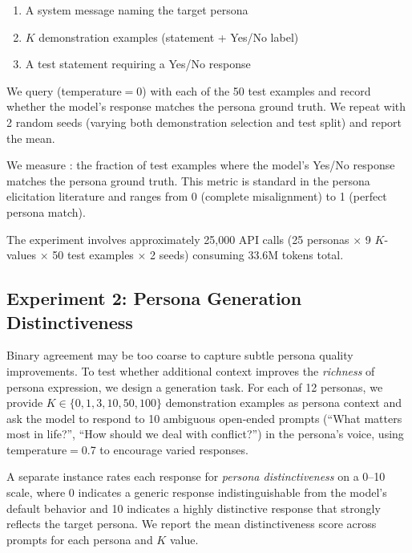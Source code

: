 \begin{enumerate}[leftmargin=*,itemsep=0pt,topsep=2pt]
    \item A system message naming the target persona
    \item $K$ demonstration examples (statement + Yes/No label)
    \item A test statement requiring a Yes/No response
\end{enumerate}

We query \gptmini (temperature$=$0) with each of the 50 test examples and record whether the model's response matches the persona ground truth. We repeat with 2 random seeds (varying both demonstration selection and test split) and report the mean.

 We measure \acmetric: the fraction of test examples where the model's Yes/No response matches the persona ground truth. This metric is standard in the persona elicitation literature \citep{choi2024picle} and ranges from 0 (complete misalignment) to 1 (perfect persona match).

 The experiment involves approximately 25,000 API calls (25 personas $\times$ 9 $K$-values $\times$ 50 test examples $\times$ 2 seeds) consuming 33.6M tokens total.

\subsection{Experiment 2: Persona Generation Distinctiveness}
\label{sec:exp2}

Binary agreement may be too coarse to capture subtle persona quality improvements. To test whether additional context improves the \emph{richness} of persona expression, we design a generation task. For each of 12 personas, we provide $K \in \{0, 1, 3, 10, 50, 100\}$ demonstration examples as persona context and ask the model to respond to 10 ambiguous open-ended prompts (\eg ``What matters most in life?'', ``How should we deal with conflict?'') in the persona's voice, using temperature$=$0.7 to encourage varied responses.

 A separate \gptmini instance rates each response for \emph{persona distinctiveness} on a 0--10 scale, where 0 indicates a generic response indistinguishable from the model's default behavior and 10 indicates a highly distinctive response that strongly reflects the target persona. We report the mean distinctiveness score across prompts for each persona and $K$ value.


